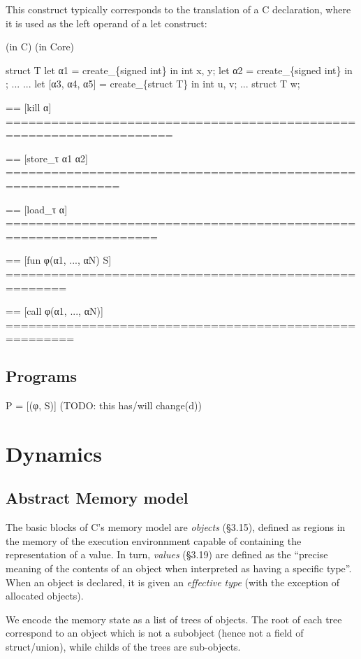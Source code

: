 \documentclass[12pt, a4paper]{article}
\begin{document}
{This construct typically corresponds to the translation of a C declaration,
where it is used as the left operand of a let construct:

  (in C)        (in Core)
  
  struct T {      let α1 = create\_\{signed int\} in
    int x, y;     let α2 = create\_\{signed int\} in
  };              ...
  ...             let [α3, α4, α5] = create\_\{struct T\} in
  int u, v;       
  ...             
  struct T w;     




== [kill α] ====================================================================

== [store\_τ α1 α2] =============================================================

== [load\_τ α] ==================================================================

== [fun φ(α1, ..., αN) S] ======================================================

== [call φ(α1, ..., αN)] =======================================================

}





\subsection{Programs}
{\color{orange} P = [(φ, S)] (TODO: this has/will change(d))}


\section{Dynamics}\label{dynamics}

\subsection{Abstract Memory model}
The basic blocks of C's memory model are {\it objects} (§3.15), defined
as regions in the memory of the execution environnment capable of
containing the representation of a value. In turn, {\it values}
(§3.19) are defined as the ``precise meaning of the contents of an
object when interpreted as having a specific type''. When an object is
declared, it is given an {\it effective type} (with the exception of
allocated objects).


We encode the memory state as a list of trees of objects. The root of
each tree correspond to an object which is not a subobject (hence not
a field of struct/union), while childs of the trees are sub-objects.
\end{document}
